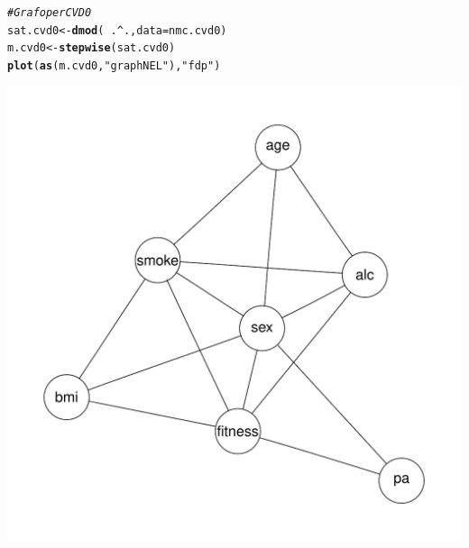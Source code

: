 \documentclass{article}\usepackage[]{graphicx}\usepackage[]{xcolor}
\makeatletter
\def\maxwidth{ %
  \ifdim\Gin@nat@width>\linewidth
    \linewidth
  \else
    \Gin@nat@width
  \fi
}
\newcommand{\hlstr}[1]{\textcolor[rgb]{0.192,0.494,0.8}{#1}}%
\newcommand{\hlcom}[1]{\textcolor[rgb]{0.678,0.584,0.686}{\textit{#1}}}%
\newcommand{\hlopt}[1]{\textcolor[rgb]{0,0,0}{#1}}%
\newcommand{\hlstd}[1]{\textcolor[rgb]{0.345,0.345,0.345}{#1}}%
\newcommand{\hlkwb}[1]{\textcolor[rgb]{0.69,0.353,0.396}{#1}}%
\newcommand{\hlkwc}[1]{\textcolor[rgb]{0.333,0.667,0.333}{#1}}%
\newcommand{\hlkwd}[1]{\textcolor[rgb]{0.737,0.353,0.396}{\textbf{#1}}}%
\newenvironment{kframe}{%
 \def\at@end@of@kframe{}%
 \ifinner\ifhmode%
  \def\at@end@of@kframe{\end{minipage}}%
  \begin{minipage}{\columnwidth}%
 \fi\fi%
 \def\FrameCommand##1{\hskip\@totalleftmargin \hskip-\fboxsep
 \colorbox{shadecolor}{##1}\hskip-\fboxsep
     \hskip-\linewidth \hskip-\@totalleftmargin \hskip\columnwidth}%
 \MakeFramed {\advance\hsize-\width
   \@totalleftmargin\z@ \linewidth\hsize
   \@setminipage}}%
 {\par\unskip\endMakeFramed%
 \at@end@of@kframe}
\newenvironment{knitrout}{}{} %
\makeatother
\begin{document}
\begin{knitrout}
\color{fgcolor}\begin{kframe}
\begin{alltt}
\hlcom{#Grafo per CVD0}
\hlstd{sat.cvd0} \hlkwb{<-} \hlkwd{dmod}\hlstd{(}\hlopt{~}\hlstd{.}\hlopt{^}\hlstd{.,} \hlkwc{data}\hlstd{=nmc.cvd0)}
\hlstd{m.cvd0} \hlkwb{<-} \hlkwd{stepwise}\hlstd{(sat.cvd0)}
\hlkwd{plot}\hlstd{(}\hlkwd{as}\hlstd{(m.cvd0,} \hlstr{"graphNEL"}\hlstd{),} \hlstr{"fdp"}\hlstd{)}
\end{alltt}
\end{kframe}
\includegraphics[width=\maxwidth]{figure/Grafo_CVD0-1} 
\end{knitrout}
    
\end{document}
